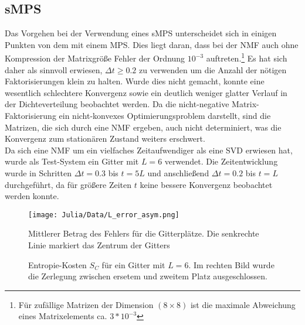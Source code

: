\documentclass[10pt,a4paper]{report}
\begin{document}
\subsection{sMPS}

Das Vorgehen bei der Verwendung eines sMPS unterscheidet sich in einigen Punkten von dem mit einem MPS. Dies liegt daran, dass bei der NMF auch ohne Kompression der Matrixgröße Fehler der Ordnung $10^{-3}$ auftreten.\footnote{Für zufällige Matrizen der Dimension $(8\times 8)$ ist die maximale Abweichung eines Matrixelements ca. $3*10^{-3}$} Es hat sich daher als sinnvoll erwiesen, $\Delta t\geq 0.2$ zu verwenden um die Anzahl der nötigen Faktorisierungen klein zu halten. Wurde dies nicht gemacht, konnte eine wesentlich schlechtere Konvergenz sowie ein deutlich weniger glatter Verlauf in der Dichteverteilung beobachtet werden. Da die nicht-negative Matrix-Faktorisierung ein nicht-konvexes Optimierungsproblem darstellt, sind die Matrizen, die sich durch eine NMF ergeben, auch nicht determiniert, was die Konvergenz zum stationären Zustand weiters erschwert.\\

Da sich eine NMF um ein vielfaches Zeitaufwendiger als eine SVD erwiesen hat, wurde als Test-System ein Gitter mit $L=6$ verwendet. Die Zeitentwicklung wurde in Schritten $\Delta t=0.3$ bis $t=5L$ und anschließend $\Delta t=0.2$ bis $t=L$ durchgeführt, da für größere Zeiten $t$ keine bessere Konvergenz beobachtet werden konnte.

\begin{figure}
\centering
\texttt{[image: Julia/Data/L\_error\_asym.png]}
\caption{Mittlerer Betrag des Fehlers für die Gitterplätze. Die senkrechte Linie markiert das Zentrum der Gitters}\label{L_error_asym}
\end{figure}

\begin{figure}
\centering
{}
\caption{Entropie-Kosten $S_C$ für ein Gitter mit $L=6$. Im rechten Bild wurde die Zerlegung zwischen ersetem und zweitem Platz ausgeschlossen.}
\end{figure}
\end{document}
